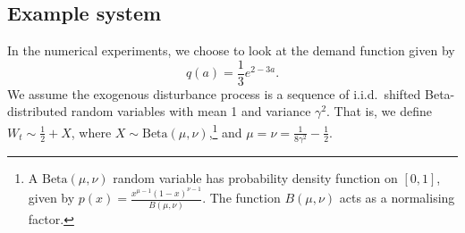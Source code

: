 \documentclass[main.tex]{subfiles}
\begin{document}
\subsection{Example system}\label{sec:bellman_example_markdown}
In the numerical experiments, we choose to look at the demand function
given by
\begin{equation}
  q(a)={\textstyle\frac{1}{3}}e^{2-3a}.
\end{equation}
We assume the exogenous disturbance process is a sequence of
i.i.d.~shifted Beta-distributed random variables with mean 1 and variance
$\gamma^2$. That is, we define $W_t\sim \frac{1}{2}+X$, where
$X\sim \mathrm{Beta}(\mu,\nu)$,\footnote{
  A $\mathrm{Beta}(\mu,\nu)$ random variable has probability density
  function on $[0,1]$, given by
  $p(x)=\frac{x^{\mu-1}{(1-x)}^{\nu-1}}{B(\mu,\nu)}$.
  The function $B(\mu,\nu)$ acts as a normalising factor.
}
and $\mu=\nu=\frac{1}{8\gamma^2}-\frac{1}{2}$.
\end{document}

